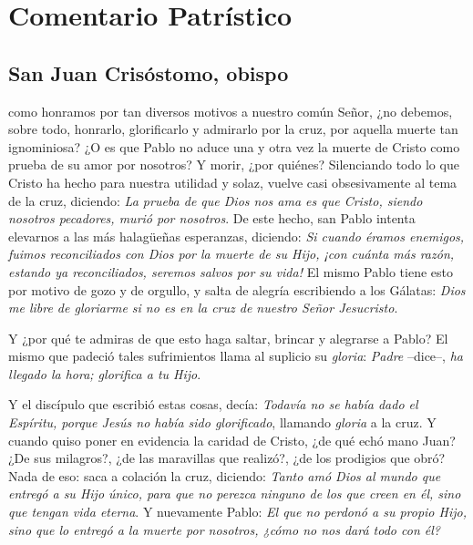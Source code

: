 \newsection
\section{Comentario Patrístico}

\subsection{San Juan Crisóstomo, obispo}



\begin{body}
 como honramos por tan diversos motivos a nuestro común Señor, ¿no debemos, sobre todo, honrarlo, glorificarlo y admirarlo por la cruz, por aquella muerte tan ignominiosa? ¿O es que Pablo no aduce una y otra vez la muerte de Cristo como prueba de su amor por nosotros? Y morir, ¿por quiénes? Silenciando todo lo que Cristo ha hecho para nuestra utilidad y solaz, vuelve casi obsesivamente al tema de la cruz, diciendo: \textit{La prueba de que Dios nos ama es que Cristo, siendo nosotros pecadores, murió por nosotros}. De este hecho, san Pablo intenta elevarnos a las más halagüeñas esperanzas, diciendo: \textit{Si cuando éramos enemigos, fuimos reconciliados con Dios por la muerte de su Hijo, ¡con cuánta más razón, estando ya reconciliados, seremos salvos por su vida!} El mismo Pablo tiene esto por motivo de gozo y de orgullo, y salta de alegría escribiendo a los Gálatas: \textit{Dios me libre de gloriarme si no es en la cruz de nuestro Señor Jesucristo}.

Y ¿por qué te admiras de que esto haga saltar, brincar y alegrarse a Pablo? El mismo que padeció tales sufrimientos llama al suplicio su \textit{gloria}: \textit{Padre} –dice–, \textit{ha llegado la hora; glorifica a tu Hijo}.

Y el discípulo que escribió estas cosas, decía: \textit{Todavía no se había dado el Espíritu, porque Jesús no había sido glorificado}, llamando \textit{gloria} a la cruz. Y cuando quiso poner en evidencia la caridad de Cristo, ¿de qué echó mano Juan? ¿De sus milagros?, ¿de las maravillas que realizó?, ¿de los prodigios que obró? Nada de eso: saca a colación la cruz, diciendo: \textit{Tanto amó Dios al mundo que entregó a su Hijo único, para que no perezca ninguno de los que creen en él, sino que tengan vida eterna}. Y nuevamente Pablo: \textit{El que no perdonó a su propio Hijo, sino que lo entregó a la muerte por nosotros, ¿cómo no nos dará todo con él?}


\end{body}
